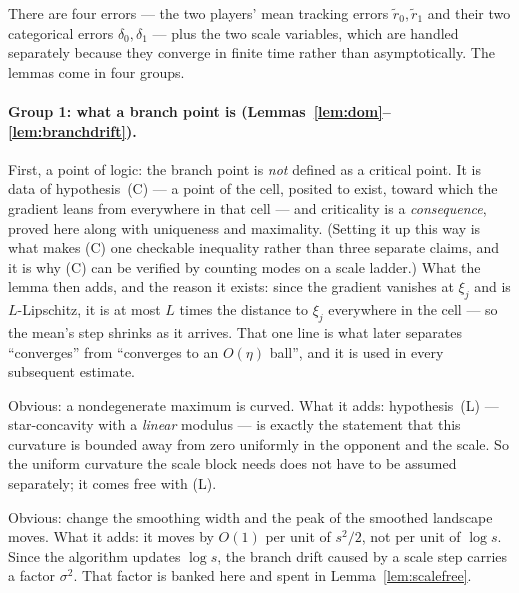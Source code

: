 \documentclass[11pt]{article}
\theoremstyle{definition}
\begin{document}
There are four errors --- the two players' mean tracking errors $\tilde r_0,
\tilde r_1$ and their two categorical errors $\delta_0, \delta_1$ --- plus the two
scale variables, which are handled separately because they converge in finite
time rather than asymptotically. The lemmas come in four groups.

\paragraph{Group 1: what a branch point is
(Lemmas~\ref{lem:dom}--\ref{lem:branchdrift}).}
\begin{description}[leftmargin=0pt, style=unboxed, font=\normalfont\itshape]
\item[Lemma~\ref{lem:dom}.] First, a point of logic: the branch point is
  \emph{not} defined as a critical point. It is data of hypothesis~(C) --- a point
  of the cell, posited to exist, toward which the gradient leans from everywhere
  in that cell --- and criticality is a \emph{consequence}, proved here along with
  uniqueness and maximality. (Setting it up this way is what makes (C) one
  checkable inequality rather than three separate claims, and it is why (C) can be
  verified by counting modes on a scale ladder.) What the lemma then adds, and
  the reason it exists: since the gradient vanishes at $\xi_j$ and is
  $L$-Lipschitz, it is at most $L$ times the distance to $\xi_j$ everywhere in the
  cell --- so the mean's step shrinks as it arrives. That one line is what later
  separates ``converges'' from ``converges to an $O(\eta)$ ball'', and it is used
  in every subsequent estimate.
\item[Lemma~\ref{lem:curv}.] Obvious: a nondegenerate maximum is curved. What it
  adds: hypothesis~(L) --- star-concavity with a \emph{linear} modulus --- is
  exactly the statement that this curvature is bounded away from zero uniformly
  in the opponent and the scale. So the uniform curvature the scale block needs
  does not have to be assumed separately; it comes free with (L).
\item[Lemma~\ref{lem:branchdrift}.] Obvious: change the smoothing width and the
  peak of the smoothed landscape moves. What it adds: it moves by $O(1)$ per unit
  of $s^2/2$, not per unit of $\log s$. Since the algorithm updates $\log s$, the
  branch drift caused by a scale step carries a factor $\sigma^2$. That factor is
  banked here and spent in Lemma~\ref{lem:scalefree}.
\end{description}
\end{document}
